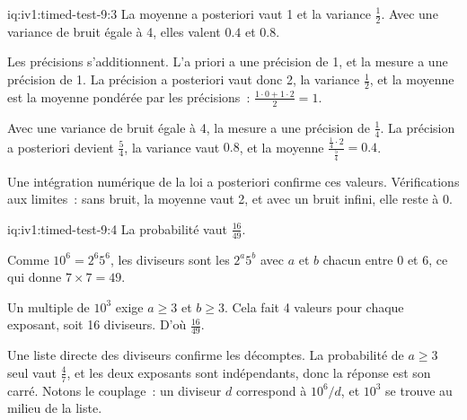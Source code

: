 \begin{solution}{iq:iv1:timed-test-9:3}
La moyenne a posteriori vaut 1 et la variance $\frac12$. Avec une variance de bruit égale à 4, elles valent $0.4$ et $0.8$.

Les précisions s'additionnent. L'a priori a une précision de 1, et la mesure a une précision de 1. La précision a posteriori vaut donc 2, la variance $\frac12$, et la moyenne est la moyenne pondérée par les précisions~: $\frac{1 \cdot 0 + 1 \cdot 2}{2} = 1$.

Avec une variance de bruit égale à 4, la mesure a une précision de $\frac14$. La précision a posteriori devient $\frac54$, la variance vaut $0.8$, et la moyenne $\frac{\frac14 \cdot 2}{\frac54} = 0.4$.

Une intégration numérique de la loi a posteriori confirme ces valeurs. Vérifications aux limites~: sans bruit, la moyenne vaut 2, et avec un bruit infini, elle reste à 0.

\end{solution}

\begin{solution}{iq:iv1:timed-test-9:4}
La probabilité vaut $\frac{16}{49}$.

Comme $10^6 = 2^6 5^6$, les diviseurs sont les $2^a5^b$ avec $a$ et $b$ chacun entre 0 et 6, ce qui donne $7 \times 7 = 49$.

Un multiple de $10^3$ exige $a \ge 3$ et $b \ge 3$. Cela fait 4 valeurs pour chaque exposant, soit 16 diviseurs. D'où $\frac{16}{49}$.

Une liste directe des diviseurs confirme les décomptes. La probabilité de $a \ge 3$ seul vaut $\frac47$, et les deux exposants sont indépendants, donc la réponse est son carré. Notons le couplage~: un diviseur $d$ correspond à $10^6/d$, et $10^3$ se trouve au milieu de la liste.

\end{solution}

